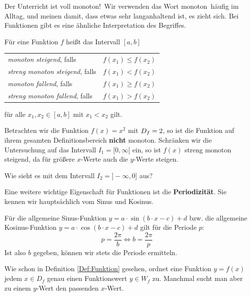 \documentclass[ngerman, 12pt]{nssheetxea}
\begin{document}
\glqq Der Unterricht ist voll monoton!\grqq \ Wir verwenden das Wort \glqq monoton\grqq \ häufig im Alltag, und meinen damit, dass etwas sehr langanhaltend ist, es zieht sich. Bei Funktionen gibt es eine ähnliche Interpretation des Begriffes.

\begin{definition}
Für eine Funktion $f$ heißt das Intervall $[a,b]$
 
\begin{center}
\begin{tabular}{p{7cm} p{3cm}}
\renewcommand{\arraystretch}{1.7}
\textit{monoton steigend}, falls & $f(x_1)\leq f(x_2)$ \\
\textit{streng monoton steigend}, falls & $f(x_1)<f(x_2)$ \\
\textit{monoton fallend}, falls & $f(x_1)\geq f(x_2)$ \\
\textit{streng monoton fallend}, falls & $f(x_1)>f(x_2)$ \\
\end{tabular}
\end{center}
für alle $x_1, x_2\in [a,b]$ mit $x_1<x_2$ gilt.

\end{definition}

\begin{example}
Betrachten wir die Funktion $f(x)=x^2$ mit $D_f=2$, so ist die Funktion auf ihrem gesamten Definitionsbereich \textbf{nicht} monoton. Schränken wir die Untersuchung auf das Intervall $I_1=[0,\infty[$ ein, so ist $f(x)$ streng monoton steigend, da für größere $x$-Werte auch die $y$-Werte steigen. \par
Wie sieht es mit dem Intervall $I_2=]-\infty, 0]$ aus?
\end{example}

Eine weitere wichtige Eigenschaft für Funktionen ist die \textbf{Periodizität}. Sie kennen wir hauptsächlich vom Sinus und Kosinus. 

\begin{theorem}
Für die allgemeine Sinus-Funktion $y=a\cdot \sin (b\cdot x - c)+d$ bzw. die allgemeine Kosinus-Funktion $y=a\cdot \cos (b\cdot x - c)+d$ gilt für die Periode $p$:
\[ p = \dfrac{2\pi}{b} \Leftrightarrow b = \dfrac{2\pi}{p} \]
Ist also $b$ gegeben, können wir stets die Periode ermitteln.
\label{Periode_SinCos}
 
\end{theorem}

Wie schon in Definition \ref{Def:Funktion} gesehen, ordnet eine Funktion $y=f(x)$ jedem $x\in D_f$ genau einen Funktionswert $y\in W_f$ zu. Manchmal sucht man aber zu einem $y$-Wert den passenden $x$-Wert.
\end{document}
